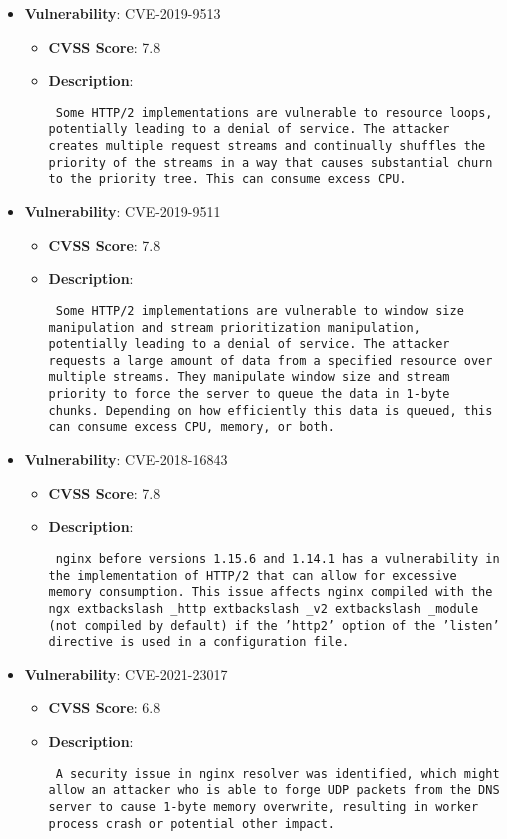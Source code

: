 \documentclass{article}
\begin{document}
\begin{itemize}
        \item \textbf{Vulnerability}: CVE-2019-9513
        \begin{itemize}
            \item \textbf{CVSS Score}:  7.8 
            \item \textbf{Description}: \parbox{\linewidth}{\texttt{ Some HTTP/2 implementations are vulnerable to resource loops, potentially leading to a denial of service. The attacker creates multiple request streams and continually shuffles the priority of the streams in a way that causes substantial churn to the priority tree. This can consume excess CPU. }}
        \end{itemize}
    
        \item \textbf{Vulnerability}: CVE-2019-9511
        \begin{itemize}
            \item \textbf{CVSS Score}:  7.8 
            \item \textbf{Description}: \parbox{\linewidth}{\texttt{ Some HTTP/2 implementations are vulnerable to window size manipulation and stream prioritization manipulation, potentially leading to a denial of service. The attacker requests a large amount of data from a specified resource over multiple streams. They manipulate window size and stream priority to force the server to queue the data in 1-byte chunks. Depending on how efficiently this data is queued, this can consume excess CPU, memory, or both. }}
        \end{itemize}
    
        \item \textbf{Vulnerability}: CVE-2018-16843
        \begin{itemize}
            \item \textbf{CVSS Score}:  7.8 
            \item \textbf{Description}: \parbox{\linewidth}{\texttt{ nginx before versions 1.15.6 and 1.14.1 has a vulnerability in the implementation of HTTP/2 that can allow for excessive memory consumption. This issue affects nginx compiled with the ngx	extbackslash _http	extbackslash _v2	extbackslash _module (not compiled by default) if the 'http2' option of the 'listen' directive is used in a configuration file. }}
        \end{itemize}
    
        \item \textbf{Vulnerability}: CVE-2021-23017
        \begin{itemize}
            \item \textbf{CVSS Score}:  6.8 
            \item \textbf{Description}: \parbox{\linewidth}{\texttt{ A security issue in nginx resolver was identified, which might allow an attacker who is able to forge UDP packets from the DNS server to cause 1-byte memory overwrite, resulting in worker process crash or potential other impact. }}
        \end{itemize}
    

\end{itemize}
\end{document}
